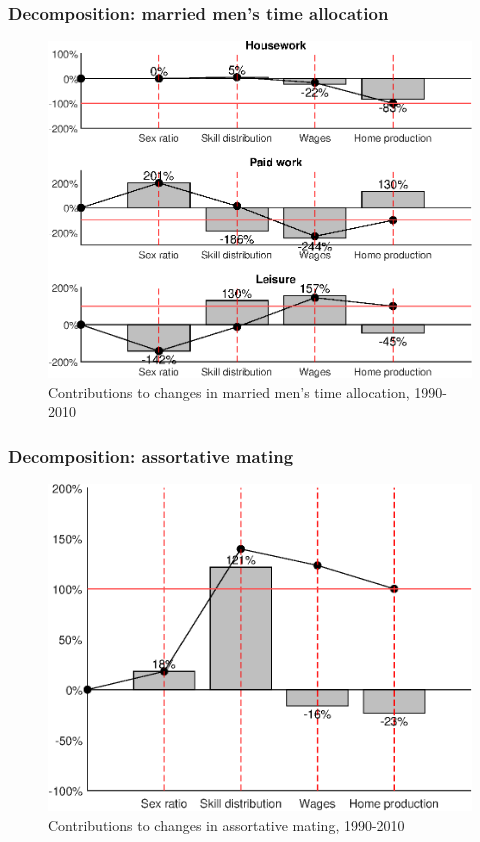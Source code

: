 \documentclass{beamer}
\begin{document}
\begin{frame}
	\frametitle{Decomposition: married men's time allocation}
	\begin{figure}[hp]
		\centering
		\caption{Contributions to changes in married men's time allocation, 1990-2010}\label{slide:decomp_male_ta}
		\includegraphics[width=.6\textwidth]{for_decomp_ta_m}
	\end{figure}
	\hyperlink{slide:decomp_male_ta_back}{}
\end{frame}

\begin{frame}
	\frametitle{Decomposition: assortative mating}\label{slide:decomp_ms}
	\begin{figure}[hp]
		\centering
		\caption{Contributions to changes in assortative mating, 1990-2010}
		\includegraphics[width=.6\textwidth]{for_decomp_ms}
	\end{figure}
	\hyperlink{slide:decomp_ms_back}{}
\end{frame}
\end{document}

